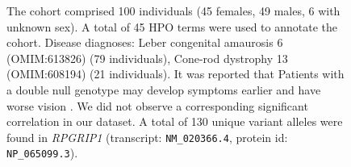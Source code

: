 \begin{figure}[htbp]
\vspace{0.2em}

\caption{ The cohort comprised 100 individuals (45 females, 49 males, 6 with unknown sex). A total of 45 HPO terms were used to annotate the cohort. Disease diagnoses: Leber congenital amaurosis 6 (OMIM:613826) (79 individuals), Cone-rod dystrophy 13 (OMIM:608194) (21 individuals). It was reported that Patients with a double null genotype may develop 
symptoms earlier and have worse vision \cite{PMID_38768745}. We did not observe a corresponding significant correlation in our dataset. A total of 130 unique variant alleles were found in \textit{RPGRIP1} (transcript: \texttt{NM\_020366.4}, protein id: \texttt{NP\_065099.3}).}
\end{figure}
